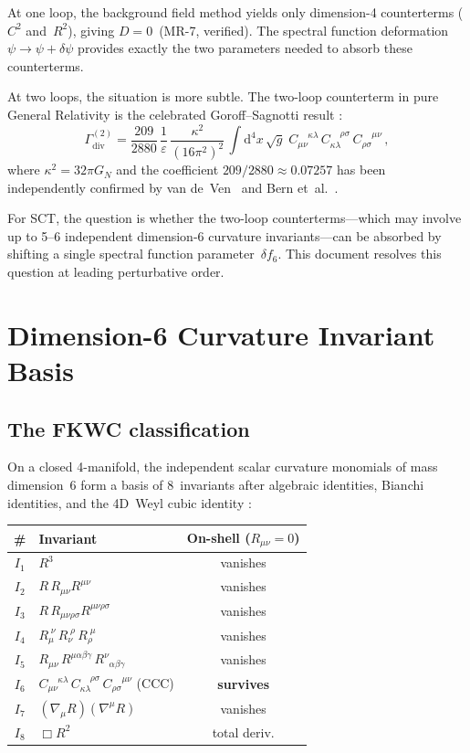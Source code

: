 \documentclass[11pt,a4paper]{article}
\newcommand{\dd}{\mathrm{d}}
\newcommand{\CCC}{C_{\mu\nu}^{\;\;\;\;\kappa\lambda}\,
  C_{\kappa\lambda}^{\;\;\;\;\rho\sigma}\,
  C_{\rho\sigma}^{\;\;\;\;\mu\nu}}
\begin{document}
At one loop, the background field method yields only dimension-4
counterterms ($C^2$ and~$R^2$), giving $D=0$~(MR-7, verified).
The spectral function deformation $\psi\to\psi+\delta\psi$ provides
exactly the two parameters needed to absorb these counterterms.

At two loops, the situation is more subtle.  The two-loop counterterm in
pure General Relativity is the celebrated Goroff--Sagnotti result
\cite{Goroff:1986,vandeVen:1992}:
\begin{equation}\label{eq:GS}
  \Gamma^{(2)}_{\mathrm{div}}
  = \frac{209}{2880}\,\frac{1}{\varepsilon}\,
    \frac{\kappa^2}{(16\pi^2)^2}\,
    \int\!\dd^4x\,\sqrt{g}\;\CCC\,,
\end{equation}
where $\kappa^2=32\pi G_N$ and the coefficient
$209/2880\approx 0.07257$ has been independently confirmed by
van de~Ven~\cite{vandeVen:1992} and Bern et~al.~\cite{Bern:2015}.

For SCT, the question is whether the two-loop counterterms---which may
involve up to 5--6 independent dimension-6 curvature invariants---can be
absorbed by shifting a single spectral function parameter~$\delta f_6$.
This document resolves this question at leading perturbative order.


\section{Dimension-6 Curvature Invariant Basis}
\label{sec:basis}

\subsection{The FKWC classification}

On a closed 4-manifold, the independent scalar curvature monomials of mass
dimension~6 form a basis of 8~invariants after algebraic identities,
Bianchi identities, and the 4D~Weyl cubic identity
\cite{Fulling:1992,Gilkey:1995}:

\begin{center}
\begin{tabular}{c l c}
\toprule
\# & Invariant & On-shell ($R_{\mu\nu}=0$) \\
\midrule
$I_1$ & $R^3$ & vanishes \\
$I_2$ & $R\,R_{\mu\nu}R^{\mu\nu}$ & vanishes \\
$I_3$ & $R\,R_{\mu\nu\rho\sigma}R^{\mu\nu\rho\sigma}$ & vanishes \\
$I_4$ & $R_{\mu}^{\;\nu}\,R_{\nu}^{\;\rho}\,R_{\rho}^{\;\mu}$ & vanishes \\
$I_5$ & $R_{\mu\nu}\,R^{\mu\alpha\beta\gamma}\,R_{\;\;\alpha\beta\gamma}^{\nu}$
      & vanishes \\
$I_6$ & $\CCC$ (CCC) & \textbf{survives} \\
$I_7$ & $(\nabla_\mu R)(\nabla^\mu R)$ & vanishes \\
$I_8$ & $\Box R^2$ & total deriv. \\
\bottomrule
\end{tabular}
\end{center}
\end{document}
